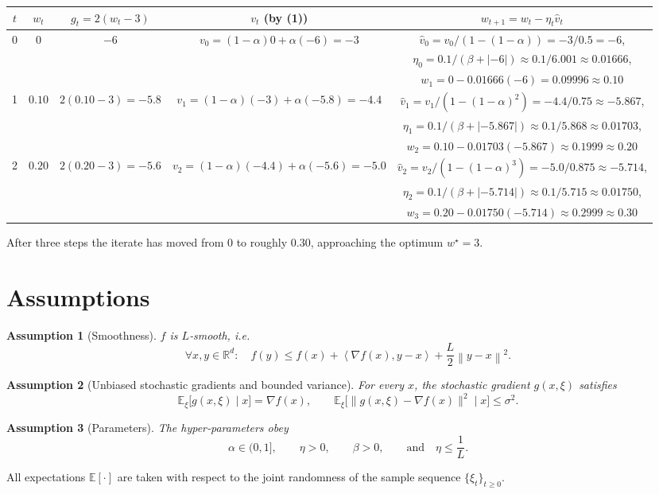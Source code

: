 \documentclass{article}
\newtheorem{assumption}{Assumption}
\newcommand{\EE}{\mathbb{E}}
\newcommand{\RR}{\mathbb{R}}
\newcommand{\norm}[1]{\left\|#1\right\|}
\newcommand{\inner}[2]{\left\langle #1,#2\right\rangle}
\newcommand{\grad}{\nabla}
\begin{document}
\begin{center}
\begin{tabular}{c|c|c|c|c}
$t$ & $w_t$ & $g_t=2(w_t-3)$ & $v_t$ (by (1)) & $w_{t+1}=w_t-\eta_t\hat v_t$\\ \midrule
0 & $0$ & $-6$ &
$v_0=(1-\alpha)0+\alpha(-6)=-3$ &
$\hat v_0=v_0/(1-(1-\alpha))=-3/0.5=-6$, \\
  &   &   &   &
$\eta_0=0.1/(\beta+|{-6}|)\approx0.1/6.001\approx0.01666$,\\
  &   &   &   &
$w_1=0-0.01666(-6)=0.09996\approx0.10$ \\ \midrule
1 & $0.10$ & $2(0.10-3)=-5.8$ &
$v_1=(1-\alpha)(-3)+\alpha(-5.8)=-4.4$ &
$\hat v_1=v_1/(1-(1-\alpha)^{2})=-4.4/0.75\approx-5.867$,\\
  &   &   &   &
$\eta_1=0.1/(\beta+|{-5.867}|)\approx0.1/5.868\approx0.01703$,\\
  &   &   &   &
$w_2=0.10-0.01703(-5.867)\approx0.1999\approx0.20$ \\ \midrule
2 & $0.20$ & $2(0.20-3)=-5.6$ &
$v_2=(1-\alpha)(-4.4)+\alpha(-5.6)=-5.0$ &
$\hat v_2=v_2/(1-(1-\alpha)^{3})=-5.0/0.875\approx-5.714$,\\
  &   &   &   &
$\eta_2=0.1/(\beta+|{-5.714}|)\approx0.1/5.715\approx0.01750$,\\
  &   &   &   &
$w_3=0.20-0.01750(-5.714)\approx0.2999\approx0.30$ 
\end{tabular}
\end{center}
After three steps the iterate has moved from $0$ to roughly $0.30$, approaching the optimum $w^{\star}=3$.

\newpage
\section*{Assumptions}
\begin{assumption}[Smoothness]\label{ass:smooth}
$f$ is $L$‑smooth, i.e.
\[
\forall x,y\in\RR^{d}:\quad 
f(y)\le f(x)+\inner{\grad f(x)}{y-x}+\frac{L}{2}\norm{y-x}^{2}.
\]
\end{assumption}
\begin{assumption}[Unbiased stochastic gradients and bounded variance]\label{ass:stoch}
For every $x$, the stochastic gradient $g(x,\xi)$ satisfies
\[
\EE_{\xi}\!\big[g(x,\xi)\mid x\big]=\grad f(x),\qquad
\EE_{\xi}\!\big[\|g(x,\xi)-\grad f(x)\|^{2}\mid x\big]\le\sigma^{2}.
\]
\end{assumption}
\begin{assumption}[Parameters]\label{ass:param}
The hyper‑parameters obey
\[
\alpha\in(0,1],\qquad \eta>0,\qquad \beta>0,\qquad 
\text{and}\quad \eta\le\frac{1}{L}.
\]
\end{assumption}
All expectations $\EE[\cdot]$ are taken with respect to the joint randomness of the sample sequence $\{\xi_t\}_{t\ge0}$.
\end{document}
